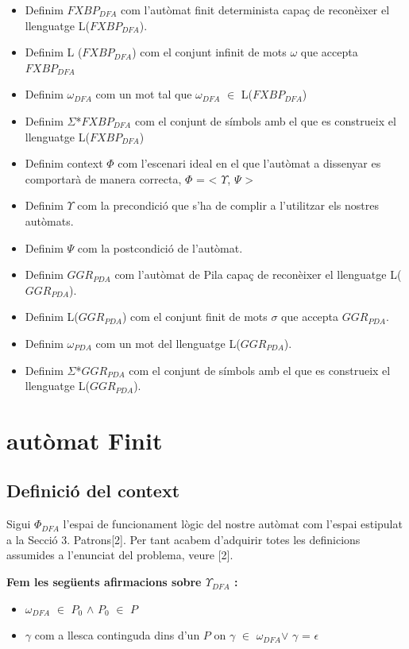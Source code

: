 \documentclass[12pt,a4paper]{report}
\def \w{$\omega$}
\def \dfa{$FXBP_{DFA} $}
\def \alphabetDFA{$\Sigma$*\dfa}
\def \alphabetPDA{$\Sigma$*\pda}
\def \wdfa{$\omega_{DFA} $}
\def \wpda{$\omega_{PDA} $}
\def \pda{$GGR_{PDA} $}
\def \context{$\Phi$}
\def \contextDFA{$\Phi_{DFA}$}
\def \pre{$\Upsilon$}
\def \preDFA{$\Upsilon_{DFA}$}
\def \post{$\Psi$}
\def \llesca{$\gamma$}
\begin{document}
\begin{itemize}
\item Definim \dfa{} com l’autòmat finit determinista capaç de reconèixer el llenguatge L(\dfa{}).
\item Definim L (\dfa{}) com el conjunt infinit de mots \w{} que accepta \dfa{}
\item Definim \wdfa{} com un mot tal que \wdfa{} $\in$ L(\dfa{})
\item Definim \alphabetDFA{} com el conjunt de símbols amb el que es construeix el llenguatge L(\dfa{})
\item Definim context \context{} com l’escenari ideal en el que l’autòmat a dissenyar es comportarà de manera correcta, \context{} = < \pre{}, \post{} >
\item Definim \pre{} com la precondició que s'ha de complir a l'utilitzar els nostres autòmats.
\item Definim \post{} com la postcondició de l'autòmat.
\item Definim \pda{} com l'autòmat de Pila capaç de reconèixer el llenguatge L(\pda{}).
\item Definim L(\pda{}) com el conjunt finit de mots $\sigma$ que accepta \pda{}.
\item Definim \wpda{} com un mot del llenguatge L(\pda{}).
\item Definim \alphabetPDA{} com el conjunt de símbols amb el que es construeix el llenguatge L(\pda).

\end{itemize}

\chapter{autòmat Finit}

\section{Definició del context}

Sigui \contextDFA{} l'espai de funcionament lògic del nostre autòmat com l'espai estipulat a la Secció 3. Patrons[2]. Per tant acabem d'adquirir totes les definicions assumides a l'enunciat del problema, veure [2].

\textbf{Fem les següents afirmacions sobre \preDFA{} :}
\begin{itemize}
\item \wdfa{} $\in$ $P_0$ $\wedge$ $P_0$ $\in$ $P$
\item \llesca{} com a llesca continguda dins d'un $P$ on \llesca{} $\in$ \wdfa $\vee$ \llesca{} = $\epsilon$
\end{itemize}
\end{document}
